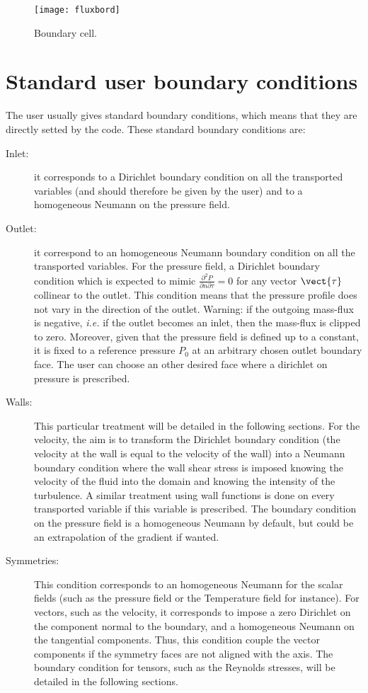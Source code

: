\begin{figure}[h]
\centerline{\texttt{[image: fluxbord]}}
\caption{\label{Base_Condli_fig_flux_condli}Boundary cell.}
\end{figure}

\section{Standard user boundary conditions}

The user usually gives standard boundary conditions, which means that 
they are directly setted by the code. These standard boundary conditions are:

\begin{description}
\item[Inlet:] it corresponds to a Dirichlet boundary condition on all the transported variables 
(and should therefore be given by the user) 
and to a homogeneous Neumann on the pressure field. 

\item[Outlet:] it correspond to an homogeneous Neumann boundary condition on all the transported variables.
For the pressure field, a Dirichlet boundary condition which is expected to mimic $\displaystyle\frac{\partial^2 P}{\partial n \partial \tau}=0$ for any vector  $\vect{\tau}$ collinear to the outlet. This condition means that the pressure
profile does not vary in the direction of the outlet. Warning: if the outgoing mass-flux is negative, 
\emph{i.e.} if the outlet becomes an inlet, then the mass-flux is clipped to zero. Moreover, given
that the pressure field is defined up to a constant, it is fixed to a reference pressure $P_0$
at an arbitrary chosen outlet boundary face. 
The user can choose an other desired face where a dirichlet on pressure is prescribed.
 
\item[Walls:] This particular treatment will be detailed in the following sections. 
For the velocity, the aim is to transform the Dirichlet boundary condition (the velocity at the wall 
is equal to the velocity of the wall) into a Neumann boundary condition where the wall shear stress
is imposed knowing the velocity of the fluid into the domain and knowing the intensity of the turbulence. 
A similar treatment using wall functions is done on every transported variable if this variable is prescribed.
The boundary condition on the pressure field is a homogeneous Neumann by default, but could
be an extrapolation of the gradient if wanted.

\item[Symmetries:] This condition corresponds to an homogeneous Neumann for the scalar fields 
(such as the pressure field or the Temperature field for instance). For vectors, such as the velocity, it corresponds
to impose a zero Dirichlet on the component normal to the boundary, and a homogeneous Neumann
on the tangential components. Thus, this condition couple the  vector components if the symmetry faces are not
aligned with the axis. The boundary condition for tensors, such as the Reynolds stresses, will be detailed in the following sections.
\end{description}

